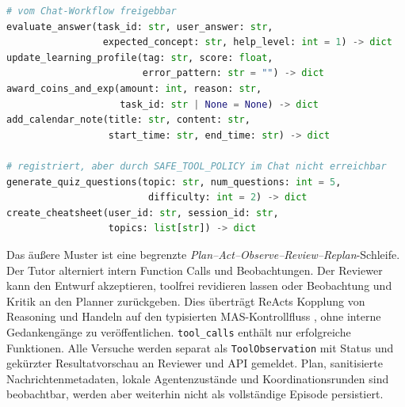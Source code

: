 \begin{lstlisting}[language=Python,float=htbp,caption={Registrierte Werkzeugsignaturen und effektiver Chat-Scope.},label={lst:tools}]
# vom Chat-Workflow freigebbar
evaluate_answer(task_id: str, user_answer: str,
                 expected_concept: str, help_level: int = 1) -> dict
update_learning_profile(tag: str, score: float,
                        error_pattern: str = "") -> dict
award_coins_and_exp(amount: int, reason: str,
                    task_id: str | None = None) -> dict
add_calendar_note(title: str, content: str,
                  start_time: str, end_time: str) -> dict

# registriert, aber durch SAFE_TOOL_POLICY im Chat nicht erreichbar
generate_quiz_questions(topic: str, num_questions: int = 5,
                         difficulty: int = 2) -> dict
create_cheatsheet(user_id: str, session_id: str,
                  topics: list[str]) -> dict
\end{lstlisting}

Das äußere Muster ist eine begrenzte
\emph{Plan--Act--Observe--Review--Replan}-Schleife. Der Tutor alterniert intern
Function Calls und Beobachtungen. Der Reviewer kann den Entwurf akzeptieren,
toolfrei revidieren lassen oder Beobachtung und Kritik an den Planner
zurückgeben. Dies überträgt ReActs Kopplung von Reasoning und Handeln auf den
typisierten MAS-Kontrollfluss \parencite{yaoEtAl2023react}, ohne interne
Gedankengänge zu veröffentlichen. \texttt{tool\_calls} enthält nur erfolgreiche
Funktionen. Alle Versuche werden separat als \texttt{ToolObservation} mit
Status und gekürzter Resultatvorschau an Reviewer und API gemeldet. Plan,
sanitisierte Nachrichtenmetadaten, lokale Agentenzustände und
Koordinationsrunden sind beobachtbar, werden aber weiterhin nicht als
vollständige Episode persistiert.
